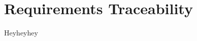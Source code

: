 \documentclass[../../dd.tex]{subfiles}
\begin{document}
	\chapter{Requirements Traceability}

	Heyheyhey
\end{document}
